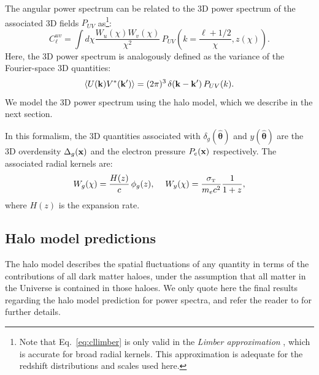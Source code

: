 \documentclass[useAMS,usenatbib]{mn2e}
\newcommand{\nv}{\hat{\boldsymbol{\theta}}}
\begin{document}
    The angular power spectrum can be related to the 3D power spectrum of the associated 3D fields $P_{UV}$ as\footnote{Note that Eq.\!~\ref{eq:cllimber} is only valid in the {\sl Limber approximation} \citep{1953ApJ...117..134L,1992ApJ...388..272K}, which is accurate for broad radial kernels. This approximation is adequate for the redshift distributions and scales used here.}:
    \begin{equation}\label{eq:cllimber}
      C_\ell^{uv} = \int d\chi \frac{W_u(\chi)W_v(\chi)}{\chi^2}\,P_{UV}\left(k=\frac{\ell+1/2}{\chi},z(\chi) \right).
    \end{equation}
    Here, the 3D power spectrum is analogously defined as the variance of the Fourier-space 3D quantities:
    \begin{equation}
      \left\langle U({\bf k})V^*({\bf k}')\right\rangle = (2\pi)^3\,\delta({\bf k}-{\bf k}')\,P_{UV}(k).
    \end{equation}
    We model the 3D power spectrum using the halo model, which we describe in the next section.

    In this formalism, the 3D quantities associated with $\delta_g(\nv)$ and $y(\nv)$ are the 3D overdensity $\Delta_g({\bf x})$ and the electron pressure $P_e({\bf x})$ respectively. The associated radial kernels are:
    \begin{equation}
      W_g(\chi)=\frac{H(z)}{c}\,\phi_g(z),\hspace{12pt}W_y(\chi)=\frac{\sigma_{\scriptscriptstyle\rm T}}{m_ec^2}\frac{1}{1+z},
    \end{equation}
    where $H(z)$ is the expansion rate.

  \subsection{Halo model predictions}\label{ssec:theory.hm}
    The halo model describes the spatial fluctuations of any quantity in terms of the contributions of all dark matter haloes, under the assumption that all matter in the Universe is contained in those haloes. We only quote here the final results regarding the halo model prediction for power spectra, and refer the reader to \cite{2000MNRAS.318..203S,2000MNRAS.318.1144P,2002PhR...372....1C} for further details.
    
\end{document}
